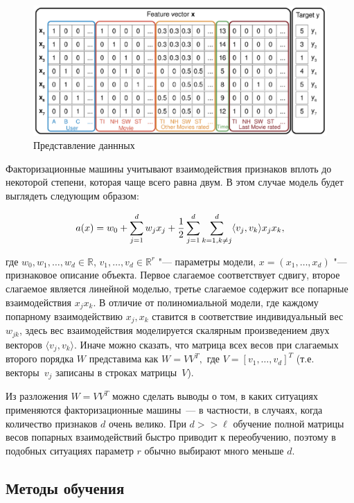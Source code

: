 \documentclass[12pt,a4paper]{article}
\begin{document}
\begin{figure}[h!]
\centering
\includegraphics[scale=0.8]{feature_table.eps}
\caption{Представление даннных}
\label{feature_table}
\end{figure}

Факторизационные машины учитывают взаимодействия признаков вплоть до некоторой степени, которая чаще всего равна двум. В этом случае модель будет выглядеть следующим образом:

\begin{equation}
	a(x) = w_0 + \sum_{j=1}^d w_j x_j 
	+ \frac{1}{2} \sum_{j=1}^d\sum_{k=1, \\ k \ne j}^d \langle v_j, v_k \rangle x_j x_k,
\end{equation}

где $w_0, w_1, \dots, w_d \in \mathbb{R}$, $v_1, \dots, v_d \in \mathbb{R}^r$ "--- параметры модели, $x = \left(x_1, \dots, x_d \right)$ "--- признаковое описание объекта. Первое слагаемое соответствует сдвигу, второе слагаемое является линейной моделью, третье слагаемое содержит все попарные взаимодействия $x_j x_k$. В отличие от полиномиальной модели, где каждому попарному взаимодействию $x_j, x_k$ ставится в соответствие индивидуальный вес $w_{jk}$, здесь вес взаимодействия моделируется скалярным произведением двух векторов $\langle v_{j}, v_{k} \rangle$. Иначе можно сказать, что матрица всех весов при слагаемых второго порядка $W$ представима как $W = VV^T,$ где $V = \left[ v_1, \dots, v_d \right]^T$ (т.е. векторы~$v_j$ записаны в строках матрицы~$V$).

Из разложения $W = VV^T$ можно сделать выводы о том, в каких ситуациях применяются факторизационные машины~--- в частности, в случаях, когда количество признаков $d$ очень велико. При $d >> \ell$ обучение полной матрицы весов попарных взаимодействий быстро приводит к переобучению, поэтому в подобных ситуациях параметр $r$ обычно выбирают много меньше $d$.

\subsection{Методы обучения}
\end{document}

